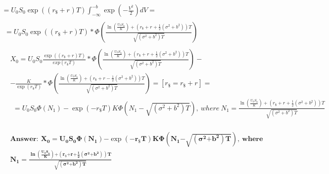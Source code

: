\documentclass[12pt, a4paper]{article}
\begin{document}
\begin{enumerate}
\[\begin{matrix}
 = U_{0}S_{0}\exp\left( \left( r_{\$} + r_{} \right)T \right)\int_{- \infty}^{- b}{\exp\left( - \frac{V^{2}}{2} \right)}dV = \\
\begin{matrix}
 = U_{0}S_{0}\exp\left( \left( r_{\$} + r_{} \right)T \right)*\Phi\left( \frac{\ln\left( \frac{{U_{0}S}_{0}}{K} \right) + \left( r_{\$} + r_{} + \frac{1}{2}\left( \sigma^{2} + b^{2} \right) \right)T}{\sqrt{\left( \sigma^{2} + b^{2} \right)T}} \right) \\
\begin{matrix}
\begin{matrix}
X_{0} = U_{0}S_{0}\frac{\exp\left( \left( r_{\$} + r_{} \right)T \right)}{exp\left( r_{\$}T \right)}*\Phi\left( \frac{\ln\left( \frac{{U_{0}S}_{0}}{K} \right) + \left( r_{\$} + r_{} + \frac{1}{2}\left( \sigma^{2} + b^{2} \right) \right)T}{\sqrt{\left( \sigma^{2} + b^{2} \right)T}} \right) - \\
 - \frac{K}{\exp\left( r_{\$}T \right)}*\Phi\left( \frac{\ln\left( \frac{{U_{0}S}_{0}}{K} \right) + \left( r_{\$} + r_{} - \frac{1}{2}\left( \sigma^{2} + b^{2} \right) \right)T}{\sqrt{\left( \sigma^{2} + b^{2} \right)T}} \right) = \left\lbrack r_{\$} = r_{\$} + r_{} \right\rbrack = \\
\begin{matrix}
 = U_{0}S_{0}\Phi\left( N_{1} \right) - \exp{\left( {- r}_{\$}T \right)K}\Phi\left( N_{1} - \sqrt{\left( \sigma^{2} + b^{2} \right)T} \right),\ where\ N_{1} = \frac{\ln\left( \frac{{U_{0}S}_{0}}{K} \right) + \left( r_{\$} + r_{} + \frac{1}{2}\left( \sigma^{2} + b^{2} \right) \right)T}{\sqrt{\left( \sigma^{2} + b^{2} \right)T}} \\
\end{matrix} \\
\end{matrix} \\
\begin{matrix}
\mathbf{Answer:\ X}_{\mathbf{0}}\mathbf{=}\mathbf{U}_{\mathbf{0}}\mathbf{S}_{\mathbf{0}}\mathbf{\Phi}\left( \mathbf{N}_{\mathbf{1}} \right)\mathbf{-}\exp{\left( \mathbf{- r}_{\mathbf{\$}}\mathbf{T} \right)\mathbf{K}}\mathbf{\Phi}\left( \mathbf{N}_{\mathbf{1}}\mathbf{-}\sqrt{\left( \mathbf{\sigma}^{\mathbf{2}}\mathbf{+}\mathbf{b}^{\mathbf{2}} \right)\mathbf{T}} \right)\mathbf{,\ where} \\
\mathbf{N}_{\mathbf{1}}\mathbf{=}\frac{\mathbf{\ln}\left( \frac{{\mathbf{U}_{\mathbf{0}}\mathbf{S}}_{\mathbf{0}}}{\mathbf{K}} \right)\mathbf{+}\left( \mathbf{r}_{\mathbf{\$}}\mathbf{+}\mathbf{r}_{\mathbf{}}\mathbf{+}\frac{\mathbf{1}}{\mathbf{2}}\left( \mathbf{\sigma}^{\mathbf{2}}\mathbf{+}\mathbf{b}^{\mathbf{2}} \right) \right)\mathbf{T}}{\sqrt{\left( \mathbf{\sigma}^{\mathbf{2}}\mathbf{+}\mathbf{b}^{\mathbf{2}} \right)\mathbf{T}}} \\
\end{matrix} \\
\end{matrix} \\
\end{matrix} \\
\end{matrix}\]


\end{enumerate}
\end{document}
